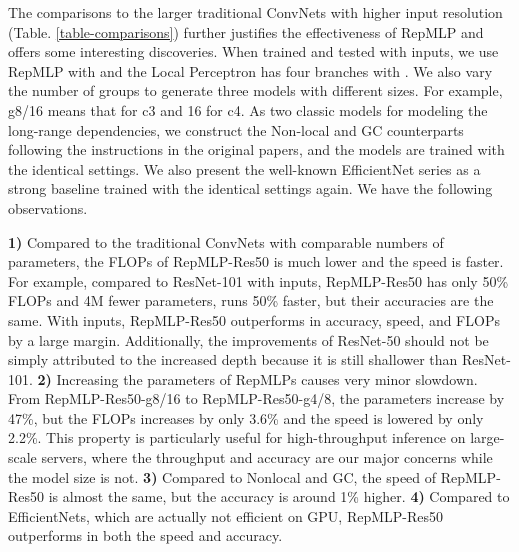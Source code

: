 \documentclass[10pt,twocolumn,letterpaper]{article}
\begin{document}
The comparisons to the larger traditional ConvNets with higher input resolution (Table. \ref{table-comparisons}) further justifies the effectiveness of RepMLP and offers some interesting discoveries. When trained and tested with  inputs, we use RepMLP with  and the Local Perceptron has four branches with . We also vary the number of groups to generate three models with different sizes. For example, g8/16 means that  for c3 and 16 for c4. As two classic models for modeling the long-range dependencies, we construct the Non-local \cite{wang2018non} and GC \cite{cao2019gcnet} counterparts following the instructions in the original papers, and the models are trained with the identical settings. We also present the well-known EfficientNet \cite{efficientnet} series as a strong baseline trained with the identical settings again. We have the following observations.

\textbf{1)} Compared to the traditional ConvNets with comparable numbers of parameters, the FLOPs of RepMLP-Res50 is much lower and the speed is faster. For example, compared to ResNet-101 with  inputs, RepMLP-Res50 has only 50\% FLOPs and 4M fewer parameters, runs 50\% faster, but their accuracies are the same. With  inputs, RepMLP-Res50 outperforms in accuracy, speed, and FLOPs by a large margin. Additionally, the improvements of ResNet-50 should not be simply attributed to the increased depth because it is still shallower than ResNet-101. \textbf{2)} Increasing the parameters of RepMLPs causes very minor slowdown. From RepMLP-Res50-g8/16 to RepMLP-Res50-g4/8, the parameters increase by 47\%, but the FLOPs increases by only 3.6\% and the speed is lowered by only 2.2\%. This property is particularly useful for high-throughput inference on large-scale servers, where the throughput and accuracy are our major concerns while the model size is not. \textbf{3)} Compared to Nonlocal and GC, the speed of RepMLP-Res50 is almost the same, but the accuracy is around 1\% higher. \textbf{4)} Compared to EfficientNets, which are actually not efficient on GPU, RepMLP-Res50 outperforms in both the speed and accuracy.
\end{document}
